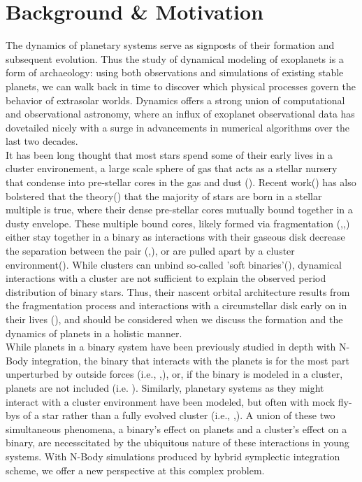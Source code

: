 \documentclass{aastex631}
\begin{document}
\section{Background \& Motivation}
\indent The dynamics of planetary systems serve as signposts of their formation and subsequent evolution. Thus the study of dynamical modeling 
of exoplanets is a form of archaeology: using both observations and simulations of existing stable planets, we can walk back in 
time to discover which physical processes govern the behavior of extrasolar worlds.  Dynamics offers a strong union of computational 
and observational astronomy, where an influx of exoplanet observational data has dovetailed nicely with a surge in advancements in numerical algorithms
over the last two decades. \\
\indent It has been long thought that most stars spend some of their early lives in a cluster environement, a large scale sphere of gas that acts as a stellar nursery
 that condense into pre-stellar cores in the gas and dust (\cite{lad03}). Recent work(\cite{sad17}) has also bolstered that the theory(\cite{kro95}) that the majority of stars 
 are born in a stellar multiple is true, where their dense pre-stellar cores mutually bound together in a dusty envelope. 
 These multiple bound cores, likely formed
 via fragmentation (\cite{bon94},\cite{bat03},\cite{tur09}) either stay together in a binary as interactions with their gaseous
 disk decrease the separation between the pair (\cite{bat00},\cite{bat03}), or are pulled apart by a cluster environment(\cite{kro01}). 
 While clusters can unbind so-called 'soft binaries'(\cite{kro01}), dynamical interactions with a cluster are not sufficient to explain the observed
 period distribution of binary stars. Thus, their nascent orbital architecture results from the fragmentation process and interactions with a circumstellar disk
 early on in their lives (\cite{krobur01}), and should be considered when we discuss the formation and the dynamics of planets in a holistic manner.\\
 \indent While planets in a binary system have been 
 previously studied in depth with N-Body integration, the binary that interacts with the planets is for the most part unperturbed by outside forces 
 (i.e., \cite{hol99},\cite{hag07}),
 or, if the binary is modeled in a cluster, planets are not included (i.e. \cite{krobur01}). Similarly, planetary systems as they might interact with a cluster environment
 have been modeled, but often with mock fly-bys of a star rather than a fully evolved cluster (i.e., \cite{rec09},\cite{cat20}). A union of these two simultaneous phenomena,
 a binary's effect on planets and a cluster's effect on a binary, are necesscitated by the ubiquitous nature of these interactions in young systems. With N-Body simulations
 produced by hybrid symplectic integration scheme, we offer a new perspective at this complex problem. 
\end{document}
